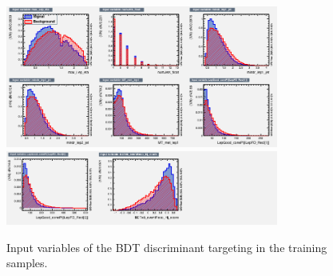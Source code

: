
\begin{figure}[hbtp]
 \begin{center}
   \includegraphics[width=0.8\textwidth]{ch8_figs/train_2lss_ttv_hj_value/variables_id_c1.png}
   \includegraphics[width=0.8\textwidth]{ch8_figs/train_2lss_ttv_hj_value/variables_id_c2.png}
   \caption[Input variables of the BDT discriminant targeting \ttv]{Input variables of the BDT discriminant targeting \ttv in the training samples.}
   \label{fig:ttvBdt_inputs}
 \end{center}
\end{figure}

